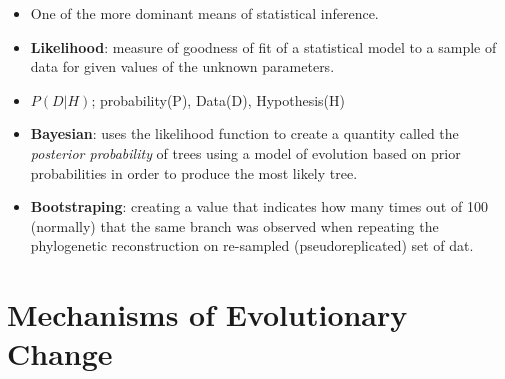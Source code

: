 \documentclass[12pt,a4paper]{article}
\begin{document}
\begin{itemize}
        \begin{itemize}
            \item One of the more dominant means of statistical inference.
            \item \textbf{Likelihood}: measure of goodness of fit of a statistical model to a sample of data for given values of the unknown parameters.
            \item {\color{o-Sun}\(P(D|H)\)}; probability(P), Data(D), Hypothesis(H)
            \item \textbf{Bayesian}: uses the likelihood function to create a quantity called the \textit{posterior probability} of trees using a model of evolution based on prior probabilities in order to produce the most likely tree.
            \item \textbf{Bootstraping}: creating a value that indicates how many times out of 100 (normally) that the same branch was observed when repeating the phylogenetic reconstruction on re-sampled (pseudoreplicated) set of dat.
        \end{itemize}
\end{itemize}

\clearpage
\setcounter{section}{5}
\section{Mechanisms of Evolutionary Change}
\end{document}
